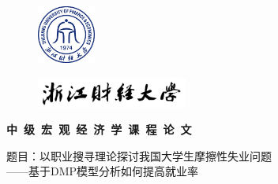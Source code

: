 \begin{titlepage}
\begin{figure}[htbp]
    \vspace{-1.3cm}
    \hspace{11.97cm}
	\includegraphics[width=1.9cm, height=1.91cm]{../figures/a01_xh.png}
\end{figure}
\begin{figure}[htbp]
    \vspace{-0.9cm}
    \hspace{10.53cm}
    \includegraphics[height=1cm]{../figures/zjcjdxxm.pdf}
\end{figure}

\begin{center}

\vspace{0.56cm}
\begin{center}
{\bf {\song{} \selectfont  中~级~宏~观~经~济~学~课~程~论~文}}
\end{center}

\vspace{3.3cm}

\begin{center}
{\heiti{} \selectfont 题目：以职业搜寻理论探讨我国大学生摩擦性失业问题 }\\
\vspace{1.4em}
{\kaishu{} \selectfont ——基于DMP模型分析如何提高就业率}
\end{center}


\end{center}
\end{titlepage}
